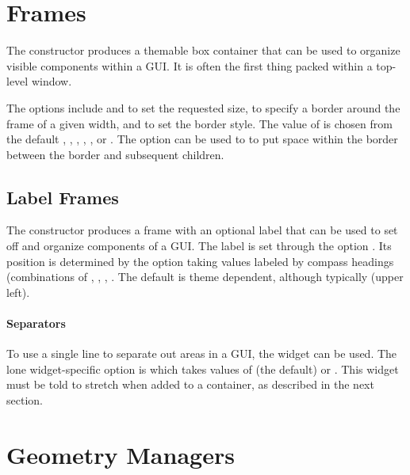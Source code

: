 \section{Frames}
\label{sec:tcltk:frames}

The  constructor produces a themable box container
that can be used to organize visible components within a GUI. It is
often the first thing packed within a top-level window.

The options include  and
 to set the requested size,
 to specify a border around the frame of
a given width, and  to set the border
style. The value of  is chosen from the default
, , , ,
, or .  The 
option can be used to to put space within the border between the
border and subsequent children.

\subsection{Label Frames}
\label{sec:tcltk:label-frames}

The  constructor produces a frame with an
optional label that can be used to set off and organize components of
a GUI. The label is set through the option
. Its position is determined by the option
 taking values labeled by compass
headings (combinations of , , , . The
default is theme dependent, although typically  (upper
left).

\paragraph{Separators}
To use a single line to separate out areas in a GUI, the
 widget can be used. The lone
widget-specific option is  which takes
values of  (the default) or . This
widget must be told to stretch when added to a container, as described
in the next section.

\section{Geometry Managers}
\label{sec:tcltk:geometry-managers}

